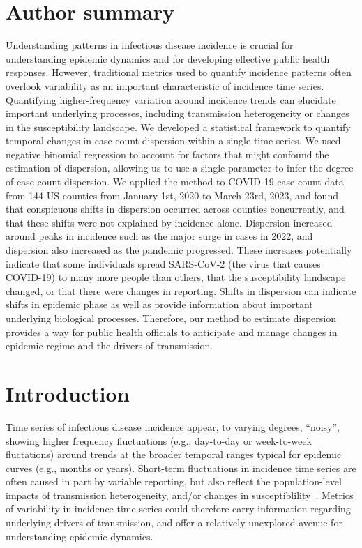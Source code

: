 \documentclass[10pt,letterpaper]{article}
\begin{document}
\section*{Author summary}
Understanding patterns in infectious disease incidence is crucial for understanding epidemic dynamics and for developing effective public health responses. 
However, traditional metrics used to quantify incidence patterns often overlook variability as an important characteristic of incidence time series. 
Quantifying higher-frequency variation around incidence trends can elucidate important underlying processes, including transmission heterogeneity or changes in the susceptibility landscape.
We developed a statistical framework to quantify temporal changes in case count dispersion within a single time series. 
We used negative binomial regression to account for factors that might confound the estimation of dispersion, allowing us to use a single parameter to infer the degree of case count dispersion. 
We applied the method to COVID-19 case count data from 144 US counties from January 1st, 2020 to March 23rd, 2023, and found that conspicuous shifts in dispersion occurred across counties concurrently, and that these shifts were not explained by incidence alone. 
Dispersion increased around peaks in incidence such as the major surge in cases in 2022, and dispersion also increased as the pandemic progressed. 
These increases potentially indicate that some individuals spread SARS-CoV-2 (the virus that causes COVID-19) to many more people than others, that the susceptibility landscape changed, or that there were changes in reporting.
Shifts in dispersion can indicate shifts in epidemic phase as well as provide information about important underlying biological processes. 
Therefore, our method to estimate dispersion provides a way for public health officials to anticipate and manage changes in epidemic regime and the drivers of transmission. 

\linenumbers

\section*{Introduction}
Time series of infectious disease incidence appear, to varying degrees, ``noisy'', showing higher frequency fluctuations (e.g., day-to-day or week-to-week fluctations) around trends at the broader temporal ranges typical for epidemic curves (e.g., months or years).
Short-term fluctuations in incidence time series are often caused in part by variable reporting, but also reflect the population-level impacts of transmission heterogeneity, and/or changes in susceptiblility~\cite{lloyd-smith_superspreading_2005, kirkegaard_superspreading_2021, sun_transmission_2021,guo2023statistical,ko2023time}.
Metrics of variability in incidence time series could therefore carry information regarding underlying drivers of transmission, and offer a relatively unexplored avenue for understanding epidemic dynamics. 
\end{document}

